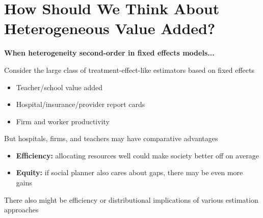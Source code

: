 \documentclass[t,aspectratio=169,11pt,presentation]{beamer}
\newenvironment{wideitemize}{\itemize\addtolength{\itemsep}{14pt}}{\enditemize}
\begin{document}
\section{How Should We Think About Heterogeneous Value Added?}

\begin{frame}{\textbf{When heterogeneity second-order in fixed effects models...}}


\begin{wideitemize}
    \item Consider the large class of treatment-effect-like estimators based on fixed effects
    \begin{itemize}
        \item Teacher/school value added
        \item Hospital/insurance/provider report cards
        \item Firm and worker productivity
    \end{itemize}
    
    \item But hospitals, firms, and teachers may have comparative advantages
    \begin{itemize}
        \item \textbf{Efficiency:} allocating resources well could make society better off on average
        \item \textbf{Equity:} if social planner also cares about gaps, there may be even more gains
    \end{itemize}
    
    \item There also might be efficiency or distributional implications of various estimation approaches
    
\end{wideitemize}
\end{frame}
\end{document}
